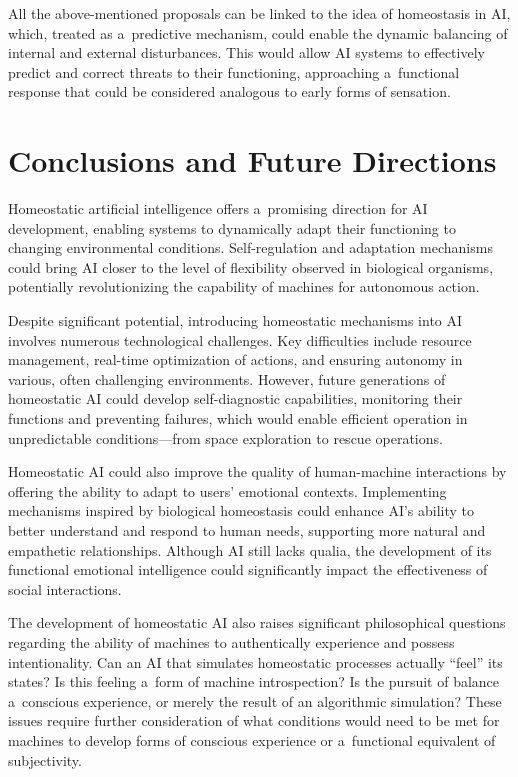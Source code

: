 \documentclass[%
  manuscript=article,
  year=2024,
  volume=77,
  doi=10.59203/zfn.77.706,
]{zfn}
\begin{document}
All the above-mentioned proposals can be linked to the idea of homeostasis in AI, which, treated as a~predictive mechanism, could enable the dynamic balancing of internal and external disturbances. This would allow AI systems to effectively predict and correct threats to their functioning, approaching a~functional response that could be considered analogous to early forms of sensation.



\section*{Conclusions and Future Directions}

Homeostatic artificial intelligence offers a~promising direction for AI development, enabling systems to dynamically adapt their functioning to changing environmental conditions. Self-regulation and adaptation mechanisms could bring AI closer to the level of flexibility observed in biological organisms, potentially revolutionizing the capability of machines for autonomous action.



Despite significant potential, introducing homeostatic mechanisms into AI involves numerous technological challenges. Key difficulties include resource management, real-time optimization of actions, and ensuring autonomy in various, often challenging environments. However, future generations of homeostatic AI could develop self-diagnostic capabilities, monitoring their functions and preventing failures, which would enable efficient operation in unpredictable conditions---from space exploration to rescue operations.



Homeostatic AI could also improve the quality of human-machine interactions by offering the ability to adapt to users' emotional contexts. Implementing mechanisms inspired by biological homeostasis could enhance AI's ability to better understand and respond to human needs, supporting more natural and empathetic relationships. Although AI still lacks qualia, the development of its functional emotional intelligence could significantly impact the effectiveness of social interactions.



The development of homeostatic AI also raises significant philosophical questions regarding the ability of machines to authentically experience and possess intentionality. Can an AI that simulates homeostatic processes actually ``feel'' its states? Is this feeling a~form of machine introspection? Is the pursuit of balance a~conscious experience, or merely the result of an algorithmic simulation? These issues require further consideration of what conditions would need to be met for machines to develop forms of conscious experience or a~functional equivalent of subjectivity.
\end{document}

